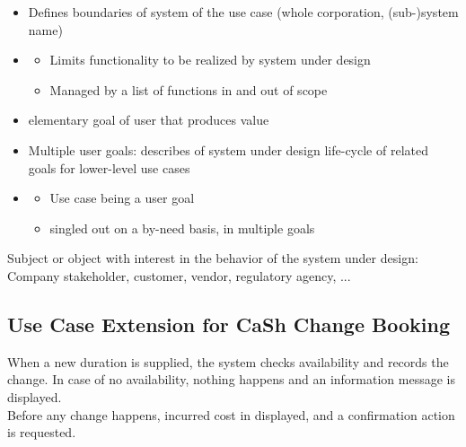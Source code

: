 \begin{defBox}[title=Two fundamental types of scope]
    \begin{itemize}
        \item {}  Defines boundaries of system of the use case (whole corporation, (sub-)system name)
        \item {} 
        \begin{itemize}
            \item Limits functionality to be realized by system under design 
            \item Managed by a list of functions in and out of scope
        \end{itemize}
    \end{itemize}
\end{defBox}
\begin{defBox}[title=Kinds of goals]
    \begin{itemize}
        \item {}  elementary goal of user that produces value
        \item {} Multiple user goals: describes  of system under design  life-cycle  of related goals   for lower-level use cases
        \item {}
        \begin{itemize}
            \item Use case being  a user goal
            \item singled out on a by-need basis,  in multiple goals
        \end{itemize}
    \end{itemize}
\end{defBox}
\begin{defBox}[title=Stakeholder \enquote{Teilhaber}]
    Subject or object with interest in the behavior of the system under design: Company stakeholder, customer, vendor, regulatory agency, ...
\end{defBox}

\subsection{Use Case Extension for CaSh Change Booking}
\begin{defBox}[title=Change Booking]
    When a new duration is supplied, the system checks availability and records the change. In case of no availability, nothing happens and an information message is displayed.\\
    Before any change happens, incurred cost in displayed, and a confirmation action is requested.\\
\end{defBox}

